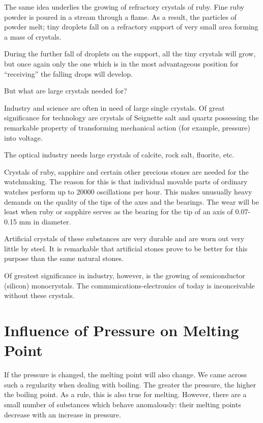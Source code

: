 The same idea underlies the growing of refractory crys­tals of ruby. Fine ruby powder is poured in a stream through a flame. As a result, the particles of powder melt; tiny droplets fall on a refractory support of very small area forming a mass of crystals. 

During the further fall of droplets on the support, all the tiny crystals will grow, but once again only the one which is in the most advantageous position for ``receiving'' the falling drops will de­velop.

But what are large crystals needed for?

Industry and science are often in need of large single crystals. Of great significance for technology are crystals of Seignette salt and quartz possessing the remarkable property of transforming mechanical action (for example, pressure) into voltage.

The optical industry needs large crystals of calcite, rock salt, fluorite, etc.

Crystals of ruby, sapphire and certain other precious stones are needed for the watchmaking. The reason for this is that individual movable parts of ordinary watches perform up to \num{20000} oscillations per hour. This makes unusually heavy demands on the quality of the tips of the axes and the bearings. The wear will be least when ruby or sapphire serves as the bearing for the tip of an axis of 0.07-0.15 \si{\milli\meter} in diameter. 

Artificial crystals of these substances are very durable and are worn out very little by steel. It is remarkable that artificial stones prove to be better for this purpose than the same natural stones.

Of greatest significance in industry, however, is the growing of semiconductor (silicon) monocrystals. The communications-electronics of today is inconceivable without these crystals.

\section{Influence of Pressure on Melting Point}

If the pressure is changed, the melting point will also change. We came across such a regularity when dealing with boiling. The greater the pressure, the higher the boiling point. As a rule, this is also true for melting. However, there are a small number of substances which behave anomalously: their melting points decrease with an increase in pressure.

